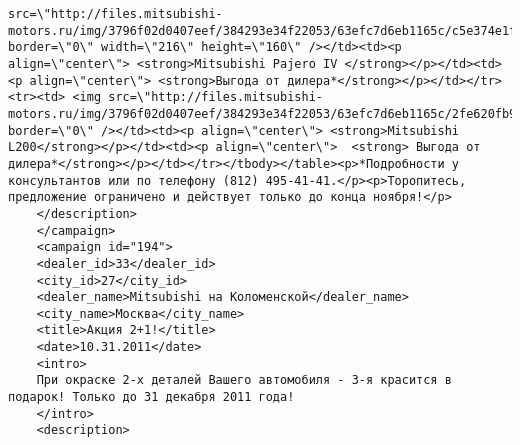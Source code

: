 \documentclass[a4paper,9pt]{extarticle}
\begin{document}
\begin{lstlisting}
src=\"http://files.mitsubishi-motors.ru/img/3796f02d0407eef/384293e34f22053/63efc7d6eb1165c/c5e374e1f155efd8fc4909bf59c02886.jpg\" border=\"0\" width=\"216\" height=\"160\" /></td><td><p align=\"center\"> <strong>Mitsubishi Pajero IV </strong></p></td><td><p align=\"center\"> <strong>Выгода от дилера*</strong></p></td></tr><tr><td> <img src=\"http://files.mitsubishi-motors.ru/img/3796f02d0407eef/384293e34f22053/63efc7d6eb1165c/2fe620fb978846ac018b86fef24580ca.jpg\" border=\"0\" /></td><td><p align=\"center\"> <strong>Mitsubishi L200</strong></p></td><td><p align=\"center\">  <strong> Выгода от дилера*</strong></p></td></tr></tbody></table><p>*Подробности у консультантов или по телефону (812) 495-41-41.</p><p>Торопитесь, предложение ограничено и действует только до конца ноября!</p>
	</description>
	</campaign>
	<campaign id="194">
	<dealer_id>33</dealer_id>
	<city_id>27</city_id>
	<dealer_name>Mitsubishi на Коломенской</dealer_name>
	<city_name>Москва</city_name>
	<title>Акция 2+1!</title>
	<date>10.31.2011</date>
	<intro>
	При окраске 2-х деталей Вашего автомобиля - 3-я красится в подарок! Только до 31 декабря 2011 года!
	</intro>
	<description>

\end{lstlisting}
\end{document}
